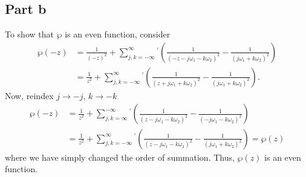 \documentclass{article}
\begin{document}
\subsection{Part b}
To show that $\wp$ is an even function, consider
\begin{align*}
\wp(-z)&=\frac{1}{(-z)^2}+\sum_{j,k=-\infty}^{\infty}{}^{'} \left(\frac{1}{(-z-j
	\omega_1-k \omega_2)^2}-\frac{1}{(j \omega_1+k \omega_2)^2}\right)\\&=
	\frac{1}{z^2}+\sum_{j,k=-\infty}^{\infty}{}^{'} \left(\frac{1}{(z+j
	\omega_1+k \omega_2)^2}-\frac{1}{(j \omega_1+k \omega_2)^2}\right).
\end{align*}
Now, reindex $j\to-j$, $k\to-k$
\begin{align*}
\wp(-z)&=\frac{1}{z^2}+\sum_{j,k=\infty}^{-\infty}{}^{'} \left(\frac{1}{(z-j
	\omega_1-k \omega_2)^2}-\frac{1}{(-j \omega_1-k \omega_2)^2}\right)\\&=
	\frac{1}{z^2}+\sum_{j,k=-\infty}^{\infty}{}^{'} \left(\frac{1}{(z-j
	\omega_1-k \omega_2)^2}-\frac{1}{(j \omega_1+k \omega_2)^2}\right)=\wp(z)
\end{align*}
where we have simply changed the order of summation. Thus, $\wp(z)$ is an even function.
\end{document}
